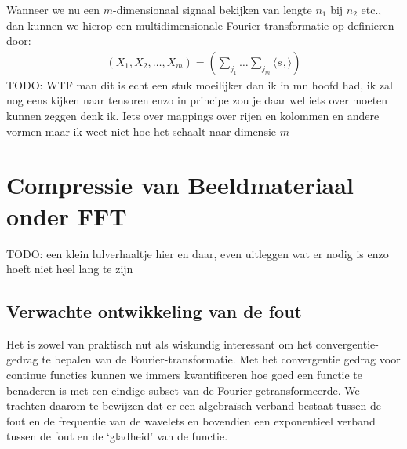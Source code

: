 \documentclass[11pt]{amsart}
\theoremstyle{remark}
\newcommand{\eq}[1]{\begin{eqnarray*} #1 \end{eqnarray*}}
\newcommand{\inpr}[2]{\langle #1 , #2 \rangle}
\begin{document}
Wanneer we nu een $m$-dimensionaal signaal bekijken van lengte $n_1$ bij $n_2$ etc., dan kunnen we
hierop een multidimensionale Fourier transformatie op definieren door:
\eq{
  (X_1,X_2,\ldots,X_m) = 
  (\sum_{j_1} \ldots \sum_{j_m} \inpr{s_{}}{}
  )
}
TODO: WTF man dit is echt een stuk moeilijker dan ik in mn hoofd had, ik zal nog eens kijken naar tensoren enzo
in principe zou je daar wel iets over moeten kunnen zeggen denk ik.
Iets over mappings over rijen en kolommen en andere vormen maar ik weet niet hoe het schaalt naar dimensie $m$

\section{Compressie van Beeldmateriaal onder FFT}
TODO: een klein lulverhaaltje hier en daar, even uitleggen wat er nodig is enzo hoeft niet heel lang te zijn

\subsection*{Verwachte ontwikkeling van de fout}
Het is zowel van praktisch nut als wiskundig interessant om het convergentie-gedrag te bepalen 
van de Fourier-transformatie. Met het convergentie gedrag voor continue functies kunnen we immers
kwantificeren hoe goed een functie te benaderen is met een eindige subset van de Fourier-getransformeerde.
We trachten daarom te bewijzen dat er een algebra\"isch verband bestaat tussen de fout en de frequentie
van de wavelets en bovendien een exponentieel verband tussen de fout en de `gladheid' van de functie.
\end{document}
